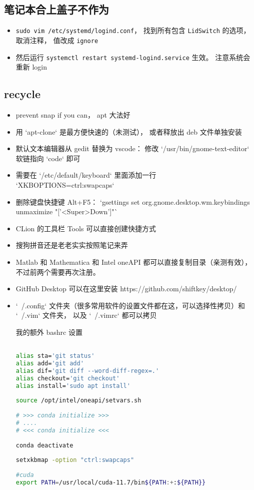 \subsection{笔记本合上盖子不作为}
\begin{itemize}
\item \verb|sudo vim /etc/systemd/logind.conf|， 找到所有包含 \verb|LidSwitch| 的选项， 取消注释， 值改成 \verb|ignore|
\item 然后运行 \verb|systemctl restart systemd-logind.service| 生效。 注意系统会重新 login
\end{itemize}


\subsection{recycle}
\begin{itemize}
\item prevent snap if you can， apt 大法好
\item 用 `apt-clone` 是最方便快速的（未测试）， 或者释放出 deb 文件单独安装
\item 默认文本编辑器从 gedit 替换为 vscode： 修改 `/usr/bin/gnome-text-editor` 软链指向 `code` 即可
\item 需要在 `/etc/default/keyboard` 里面添加一行 `XKBOPTIONS=ctrl:swapcaps`
\item 删除键盘快捷键 Alt+F5： `gsettings set org.gnome.desktop.wm.keybindings unmaximize "['<Super>Down']"`
\item CLion 的工具栏 Tools 可以直接创建快捷方式
\item 搜狗拼音还是老老实实按照笔记来弄
\item Matlab 和 Mathematica 和 Intel oneAPI 都可以直接复制目录（亲测有效）， 不过前两个需要再次注册。
\item GitHub Desktop 可以在这里安装 https://github.com/shiftkey/desktop/
\item `~/.config` 文件夹（很多常用软件的设置文件都在这，可以选择性拷贝）和 `~/.vim` 文件夹， 以及 `~/.vimrc` 都可以拷贝

我的额外 bashrc 设置
\begin{lstlisting}[language=bash]

alias sta='git status'
alias add='git add'
alias dif='git diff --word-diff-regex=.'
alias checkout='git checkout'
alias install='sudo apt install'
 
source /opt/intel/oneapi/setvars.sh
 
# >>> conda initialize >>>
# ....
# <<< conda initialize <<<
 
conda deactivate
 
setxkbmap -option "ctrl:swapcaps"
 
#cuda
export PATH=/usr/local/cuda-11.7/bin${PATH:+:${PATH}}
\end{lstlisting}
\end{itemize}
